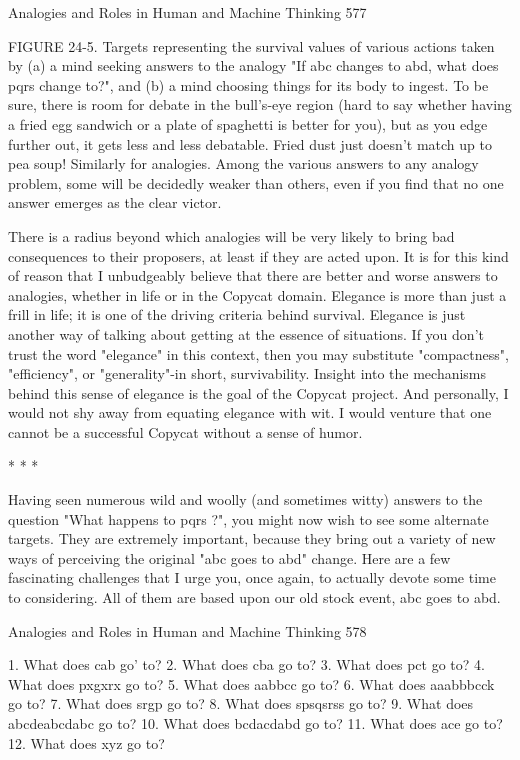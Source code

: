 Analogies and Roles in Human and Machine Thinking                                   577

FIGURE 24-5. Targets representing the survival values of various actions taken by
(a) a mind seeking answers to the analogy "If abc changes to abd, what does pqrs
change to?", and (b) a mind choosing things for its body to ingest. To be sure, there is
room for debate in the bull's-eye region (hard to say whether having a fried egg
sandwich or a plate of spaghetti is better for you), but as you edge further out, it gets
less and less debatable. Fried dust just doesn't match up to pea soup! Similarly for
analogies. Among the various answers to any analogy problem, some will be
decidedly weaker than others, even if you find that no one answer emerges as the
clear victor.

There is a radius beyond which analogies will be very likely to bring bad
consequences to their proposers, at least if they are acted upon.
        It is for this kind of reason that I unbudgeably believe that there are better and
worse answers to analogies, whether in life or in the Copycat domain. Elegance is
more than just a frill in life; it is one of the driving criteria behind survival. Elegance
is just another way of talking about getting at the essence of situations. If you don't
trust the word "elegance" in this context, then you may substitute "compactness",
"efficiency", or "generality"-in short, survivability. Insight into the mechanisms
behind this sense of elegance is the goal of the Copycat project. And personally, I
would not shy away from equating elegance with wit. I would venture that one cannot
be a successful Copycat without a sense of humor.

                                        *   *   *

        Having seen numerous wild and woolly (and sometimes witty) answers to the
question "What happens to pqrs ?", you might now wish to see some alternate targets.
They are extremely important, because they bring out a variety of new ways of
perceiving the original "abc goes to abd" change. Here are a few fascinating
challenges that I urge you, once again, to actually devote some time to considering.
All of them are based upon our old stock event, abc goes to abd.




Analogies and Roles in Human and Machine Thinking                                      578

       1. What does cab go' to?
       2. What does cba go to?
       3. What does pct go to?
       4. What does pxgxrx go to?
       5. What does aabbcc go to?
       6. What does aaabbbcck go to?
       7. What does srgp go to?
       8. What does spsqsrss go to?
       9. What does abcdeabcdabc go to?
       10. What does bcdacdabd go to?
       11. What does ace go to?
       12. What does xyz go to?

